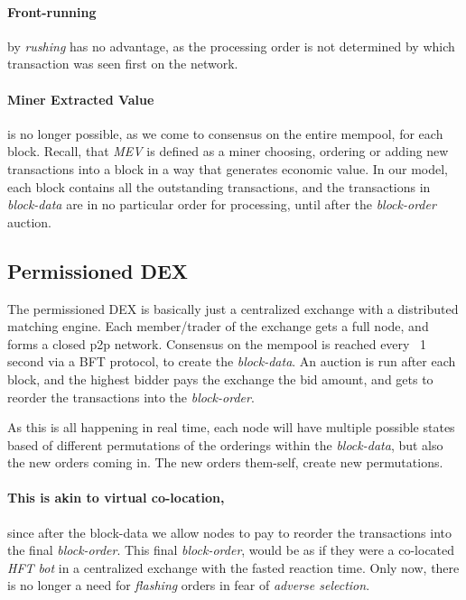 \documentclass[12pt]{article}
\begin{document}
\paragraph*{Front-running} by \emph{rushing} has no advantage, as the processing order is not determined by which transaction was seen first on the network. 

\paragraph*{Miner Extracted Value} is no longer possible, as we come to consensus on the entire mempool, for each block. Recall, that \emph{MEV} is defined as a miner choosing, ordering or adding new transactions into a block in a way that generates economic value. In our model, each block contains all the outstanding transactions, and the transactions in \emph{block-data} are in no particular order for processing, until after the \emph{block-order} auction. 

\subsection*{Permissioned DEX}
The permissioned DEX is basically just a  centralized exchange with a distributed matching engine. Each member/trader of the exchange gets a full node, and forms a closed p2p network. Consensus on the mempool is reached every ~1 second via a BFT protocol, to create the \emph{block-data}. An auction is run after each block, and the highest bidder pays the exchange the bid amount, and gets to reorder the transactions into the \emph{block-order}. 

As this is all happening in real time, each node will have multiple possible states based of different permutations of the orderings within the \emph{block-data}, but also the new orders coming in. The new orders them-self, create new permutations. 

\paragraph*{This is akin to virtual co-location,} since after the block-data we allow nodes to pay to reorder the transactions into the final \emph{block-order}. This final \emph{block-order}, would be as if they were a co-located \emph{HFT bot} in a centralized exchange with the fasted reaction time. Only now, there is no longer a need for \emph{flashing} orders in fear of \emph{adverse selection}. 
\end{document}
